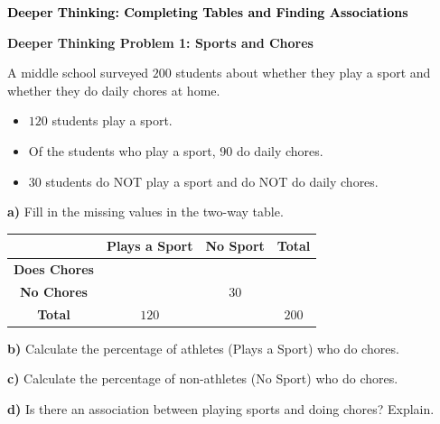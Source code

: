 \documentclass[12pt, letterpaper, fleqn]{article}
\begin{document}
\newpage

\begin{tcolorbox}[colback=customteal!20]
\large\textcolor{black}{\textbf{Deeper Thinking: Completing Tables and Finding Associations}}
\end{tcolorbox}

\vspace{3mm}

\begin{tcolorbox}[colback=white!15, colframe=black, boxrule=1.5pt, arc=4mm, left=6mm, right=6mm, top=5mm, bottom=5mm]

\textbf{Deeper Thinking Problem 1: Sports and Chores}

\medskip

\noindent
A middle school surveyed $200$ students about whether they play a sport and whether they do daily chores at home. 
\begin{itemize}
    \item $120$ students play a sport.
    \item Of the students who play a sport, $90$ do daily chores.
    \item $30$ students do NOT play a sport and do NOT do daily chores.
\end{itemize}

\vspace{2mm}

\noindent
\textbf{a)} Fill in the missing values in the two-way table.

\begin{center}
\renewcommand{\arraystretch}{1.5}
\begin{tabular}{|c|c|c|c|}
\hline
 & \textbf{Plays a Sport} & \textbf{No Sport} & \textbf{Total} \\
\hline
\textbf{Does Chores} &  &  &  \\
\hline
\textbf{No Chores} &  & $30$ &  \\
\hline
\textbf{Total} & $120$ &  & $200$ \\
\hline
\end{tabular}
\end{center}

\vspace{5mm}

\noindent
\textbf{b)} Calculate the percentage of athletes (Plays a Sport) who do chores. 

\vspace{2cm}

\noindent
\textbf{c)} Calculate the percentage of non-athletes (No Sport) who do chores.

\vspace{2cm}

\noindent
\textbf{d)} Is there an association between playing sports and doing chores? Explain.

\vspace{2cm}

\end{tcolorbox}
\end{document}
